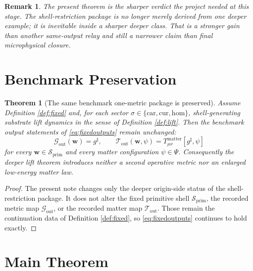 \documentclass[11pt]{article}
\newcommand{\CompletedMetric}{g^{\sharp}}
\newcommand{\Car}{\mathrm{car}}
\newcommand{\Cur}{\mathrm{cur}}
\newcommand{\Hom}{\mathrm{hom}}
\newcommand{\PrimShell}{\mathcal S_{\mathrm{prim}}}
\newcommand{\MetricOut}{\mathscr G_{\mathrm{out}}}
\newcommand{\MatterOut}{\mathscr T_{\mathrm{out}}}
\newtheorem{remark}{Remark}
\newtheorem{theorem}{Theorem}
\begin{document}
\begin{remark}
The present theorem is the sharper verdict the project needed at this stage. The shell-restriction package is no longer merely derived from one deeper example; it is inevitable inside a sharper deeper class. That is a stronger gain than another same-output relay and still a narrower claim than final microphysical closure.
\end{remark}

\section{Benchmark Preservation}

\begin{theorem}[The same benchmark one-metric package is preserved]
\label{thm:outputs}
Assume Definition \ref{def:fixed} and, for each sector \(\sigma\in\{\Car,\Cur,\Hom\}\), shell-generating substrate lift dynamics in the sense of Definition \ref{def:lift}. Then the benchmark output statements of \eqref{eq:fixedoutputs} remain unchanged:
\[
\MetricOut(\mathbf w)=\CompletedMetric,
\qquad
\MatterOut(\mathbf w,\psi)
=
T_{\mu\nu}^{\mathrm{matter}}[\CompletedMetric,\psi]
\]
for every \(\mathbf w\in\PrimShell\) and every matter configuration \(\psi\in\Psi\). Consequently the deeper lift theorem introduces neither a second operative metric nor an enlarged low-energy matter law.
\end{theorem}

\begin{proof}
The present note changes only the deeper origin-side status of the shell-restriction package. It does not alter the fixed primitive shell \(\PrimShell\), the recorded metric map \(\MetricOut\), or the recorded matter map \(\MatterOut\). Those remain the continuation data of Definition \ref{def:fixed}, so \eqref{eq:fixedoutputs} continues to hold exactly.
\end{proof}

\section{Main Theorem}
\end{document}
